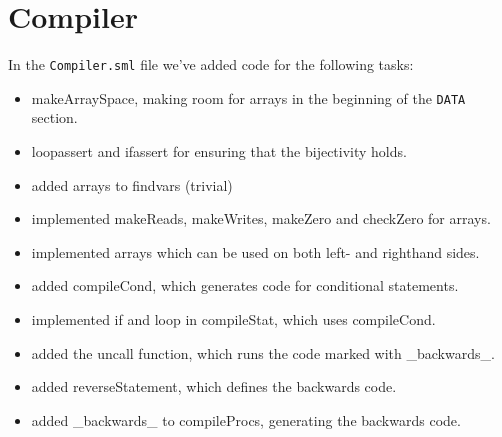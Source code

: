 \section{Compiler}

In the {\tt Compiler.sml} file we've added code for the following tasks:

\begin{itemize}
\item makeArraySpace, making room for arrays in the beginning of the {\tt DATA} section.
\item loopassert and ifassert for ensuring that the bijectivity holds.
\item added arrays to findvars (trivial)
\item implemented makeReads, makeWrites, makeZero and checkZero for arrays. 
\item implemented arrays which can be used on both left- and righthand sides.
\item added compileCond, which generates code for conditional statements.
\item implemented if and loop in compileStat, which uses compileCond.
\item added the uncall function, which runs the code marked with \_backwards\_.
\item added reverseStatement, which defines the backwards code.
\item added \_backwards\_ to compileProcs, generating the backwards code.
\end{itemize}

